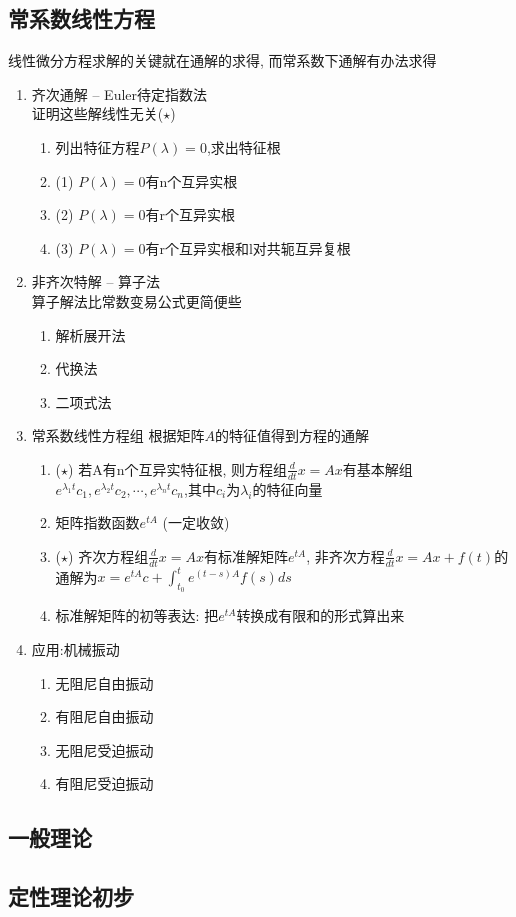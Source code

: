 \subsection{常系数线性方程}
线性微分方程求解的关键就在通解的求得, 而常系数下通解有办法求得
\begin{enumerate}
    \item 齐次通解 -- Euler待定指数法\\
    证明这些解线性无关($\star$)
    \begin{enumerate}
        \item 列出特征方程$P(\lambda)=0$,求出特征根
        \item (1) $P(\lambda)=0$有n个互异实根
        \item (2) $P(\lambda)=0$有r个互异实根
        \item (3) $P(\lambda)=0$有r个互异实根和l对共轭互异复根
    \end{enumerate}
    \item 非齐次特解 -- 算子法\\
    算子解法比常数变易公式更简便些
    \begin{enumerate}
        \item 解析展开法
        \item 代换法
        \item 二项式法
    \end{enumerate}
    \item 常系数线性方程组
    根据矩阵$A$的特征值得到方程的通解
    \begin{enumerate}
        \item ($\star$) 若A有n个互异实特征根, 则方程组$\frac{d}{dt}x=Ax$有基本解组$e^{\lambda_{1}t}c_1, e^{\lambda_{2}t}c_2, \cdots, e^{\lambda_{n}t}c_n$,其中$c_i$为$\lambda_i$的特征向量
        \item 矩阵指数函数$e^{tA}$ (一定收敛)
        \item ($\star$) 齐次方程组$\frac{d}{dt}x =Ax$有标准解矩阵$e^{tA}$, 
        非齐次方程$\frac{d}{dt}x=Ax+f(t)$的通解为$x=e^{tA}c + \int_{t_0}^{t} e^{(t-s)A}f(s)ds$
        \item 标准解矩阵的初等表达: 把$e^{tA}$转换成有限和的形式算出来
    \end{enumerate}
    \item 应用:机械振动
    \begin{enumerate}
        \item 无阻尼自由振动
        \item 有阻尼自由振动
        \item 无阻尼受迫振动
        \item 有阻尼受迫振动
    \end{enumerate}
\end{enumerate}

\subsection{一般理论}

\subsection{定性理论初步}
